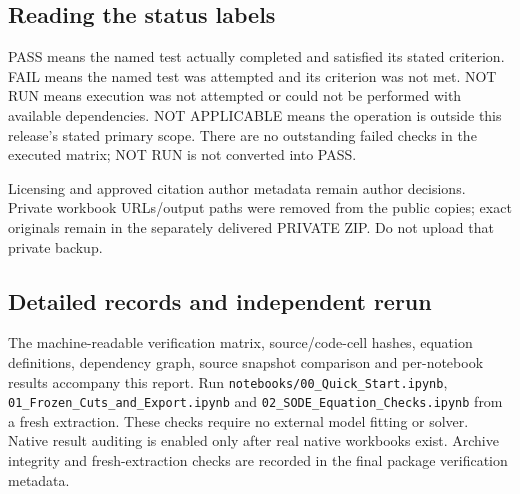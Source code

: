 \documentclass[
  11pt,
  a4paper,
]{article}
\begin{document}
\subsection{Reading the status labels}\label{reading-the-status-labels}

PASS means the named test actually completed and satisfied its stated
criterion. FAIL means the named test was attempted and its criterion was
not met. NOT RUN means execution was not attempted or could not be
performed with available dependencies. NOT APPLICABLE means the
operation is outside this release's stated primary scope. There are no
outstanding failed checks in the executed matrix; NOT RUN is not
converted into PASS.

Licensing and approved citation author metadata remain author decisions.
Private workbook URLs/output paths were removed from the public copies;
exact originals remain in the separately delivered PRIVATE ZIP. Do not
upload that private backup.

\subsection{Detailed records and independent
rerun}\label{detailed-records-and-independent-rerun}

The machine-readable verification matrix, source/code-cell hashes,
equation definitions, dependency graph, source snapshot comparison and
per-notebook results accompany this report. Run
\texttt{notebooks/00\_Quick\_Start.ipynb},
\texttt{01\_Frozen\_Cuts\_and\_Export.ipynb} and
\texttt{02\_SODE\_Equation\_Checks.ipynb} from a fresh extraction. These
checks require no external model fitting or solver. Native result
auditing is enabled only after real native workbooks exist. Archive
integrity and fresh-extraction checks are recorded in the final package
verification metadata.
\end{document}
